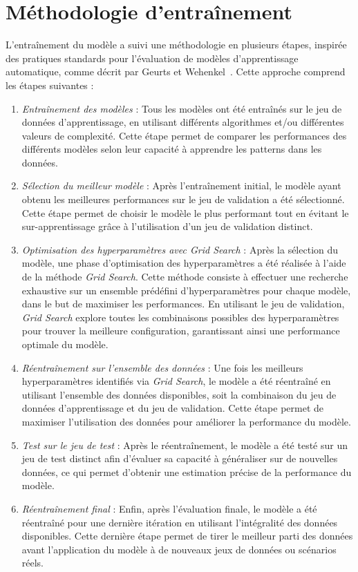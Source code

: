 \documentclass[12pt]{report}
\begin{document}
\section{Méthodologie d'entraînement}

L’entraînement du modèle a suivi une méthodologie en plusieurs étapes, inspirée des pratiques standards pour l'évaluation de modèles d'apprentissage automatique, comme décrit par Geurts et Wehenkel~\cite{geurts2006}. Cette approche comprend les étapes suivantes :

\begin{enumerate}
    \item \textit{Entraînement des modèles} : Tous les modèles ont été entraînés sur le jeu de données d'apprentissage, en utilisant différents algorithmes et/ou différentes valeurs de complexité. Cette étape permet de comparer les performances des différents modèles selon leur capacité à apprendre les patterns dans les données.

    \item \textit{Sélection du meilleur modèle} : Après l'entraînement initial, le modèle ayant obtenu les meilleures performances sur le jeu de validation a été sélectionné. Cette étape permet de choisir le modèle le plus performant tout en évitant le sur-apprentissage grâce à l'utilisation d'un jeu de validation distinct.

    \item \textit{Optimisation des hyperparamètres avec Grid Search} : Après la sélection du modèle, une phase d'optimisation des hyperparamètres a été réalisée à l'aide de la méthode \textit{Grid Search}. Cette méthode consiste à effectuer une recherche exhaustive sur un ensemble prédéfini d'hyperparamètres pour chaque modèle, dans le but de maximiser les performances. En utilisant le jeu de validation, \textit{Grid Search} explore toutes les combinaisons possibles des hyperparamètres pour trouver la meilleure configuration, garantissant ainsi une performance optimale du modèle.

    \item \textit{Réentraînement sur l'ensemble des données} : Une fois les meilleurs hyperparamètres identifiés via \textit{Grid Search}, le modèle a été réentraîné en utilisant l'ensemble des données disponibles, soit la combinaison du jeu de données d'apprentissage et du jeu de validation. Cette étape permet de maximiser l’utilisation des données pour améliorer la performance du modèle.

    \item \textit{Test sur le jeu de test} : Après le réentraînement, le modèle a été testé sur un jeu de test distinct afin d’évaluer sa capacité à généraliser sur de nouvelles données, ce qui permet d’obtenir une estimation précise de la performance du modèle.

    \item \textit{Réentraînement final} : Enfin, après l'évaluation finale, le modèle a été réentraîné pour une dernière itération en utilisant l'intégralité des données disponibles. Cette dernière étape permet de tirer le meilleur parti des données avant l’application du modèle à de nouveaux jeux de données ou scénarios réels.
\end{enumerate}
\end{document}
